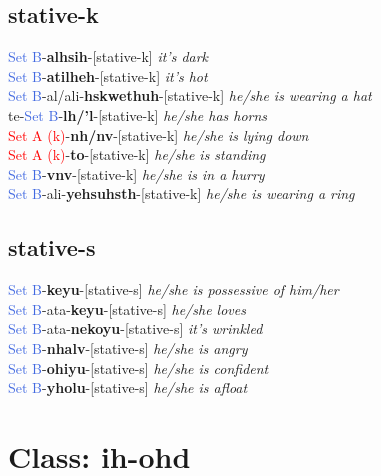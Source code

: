 \documentclass[oneside,openany]{book}%
\begin{document}
\subsection*{stative-k}%
\textcolor{RoyalBlue}{Set B}{-}\textbf{alhsih}{-}[stative-k] \textit{ it's dark} \\%
\textcolor{RoyalBlue}{Set B}{-}\textbf{atilheh}{-}[stative-k] \textit{ it's hot} \\%
\textcolor{RoyalBlue}{Set B}{-}al/ali{-}\textbf{hskwethuh}{-}[stative-k] \textit{ he/she is wearing a hat} \\%
te{-}\textcolor{RoyalBlue}{Set B}{-}\textbf{lh/'l}{-}[stative-k] \textit{ he/she has horns} \\%
\textcolor{Red}{Set A (k)}{-}\textbf{nh/nv}{-}[stative-k] \textit{ he/she is lying down} \\%
\textcolor{Red}{Set A (k)}{-}\textbf{to}{-}[stative-k] \textit{ he/she is standing} \\%
\textcolor{RoyalBlue}{Set B}{-}\textbf{vnv}{-}[stative-k] \textit{ he/she is in a hurry} \\%
\textcolor{RoyalBlue}{Set B}{-}ali{-}\textbf{yehsuhsth}{-}[stative-k] \textit{ he/she is wearing a ring} \\%
\vspace{1em}%
\needspace{1in}%
\subsection*{stative-s}%
\textcolor{RoyalBlue}{Set B}{-}\textbf{keyu}{-}[stative-s] \textit{ he/she is possessive of him/her} \\%
\textcolor{RoyalBlue}{Set B}{-}ata{-}\textbf{keyu}{-}[stative-s] \textit{ he/she loves} \\%
\textcolor{RoyalBlue}{Set B}{-}ata{-}\textbf{nekoyu}{-}[stative-s] \textit{ it's wrinkled} \\%
\textcolor{RoyalBlue}{Set B}{-}\textbf{nhalv}{-}[stative-s] \textit{ he/she is angry} \\%
\textcolor{RoyalBlue}{Set B}{-}\textbf{ohiyu}{-}[stative-s] \textit{ he/she is confident} \\%
\textcolor{RoyalBlue}{Set B}{-}\textbf{yholu}{-}[stative-s] \textit{ he/she is afloat} \\%
\vspace{1em}%
\needspace{3in}%
\section*{Class: ih-ohd}%
%
\needspace{1in}%
\end{document}
